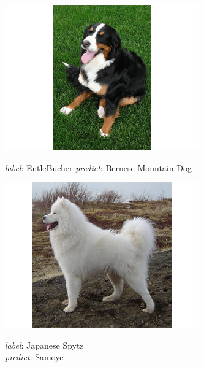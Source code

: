 \documentclass{article}
\begin{document}
\begin{figure}[h]
	\begin{subfigure}{0.32\linewidth}
		\centering
		\includegraphics[width=\linewidth]{pics/f2}
		\caption{}
		\emph{label}: EntleBucher \newline \emph{predict}: Bernese Mountain Dog
		\label{fig:f2}
	\end{subfigure} 
	\begin{subfigure}{0.32\linewidth}
		\centering
		\includegraphics[width=\linewidth]{pics/d2}
		\caption{}
		\emph{label}: Japanese Spytz \\ \emph{predict}: Samoye 
		\label{fig:d2}
	\end{subfigure} 
	\begin{subfigure}{0.32\linewidth}
		\centering

\end{subfigure}
\end{figure}
\end{document}
